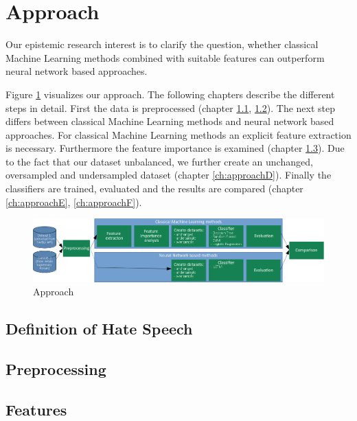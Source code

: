 \section{Approach} 
\label{approach}

Our epistemic research interest is to clarify the question, whether classical Machine Learning methods combined with suitable features can outperform neural network based approaches.

Figure \ref{fig:overall_pipeline} visualizes our approach. The following chapters describe the different steps in detail. First the data is preprocessed (chapter \ref{ch:approachA}, \ref{ch:approachB}). 
The next step differs between classical Machine Learning methods and neural network based approaches. For classical Machine Learning methods an explicit feature extraction is necessary. Furthermore the feature importance is ex\-am\-ined (chapter \ref{ch:approachC}). Due to the fact that our dataset unbalanced, we further create an unchanged, oversampled and undersampled dataset (chapter \ref{ch:approachD}). Finally the classifiers are trained, evaluated and the results are compared (chapter \ref{ch:approachE}, \ref{ch:approachF}). 

\begin{figure}[ht]
	\centering
	\includegraphics[width=1.0\linewidth]{figures/pipeline.png}
	\caption{Approach}
	\label{fig:overall_pipeline}
\end{figure}

\subsection{Definition of Hate Speech} 
\label{ch:approachA}

\subsection{Preprocessing}
\label{ch:approachB}

\subsection{Features}
\label{ch:approachC}

